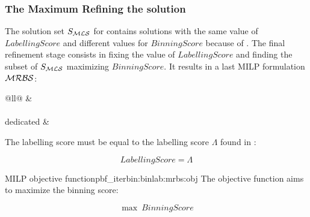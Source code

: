 \subsubsection{The Maximum Refining the \MLS{} solution}\label{sec:pbf_iterbin:binlab:mrbs}

The solution set \(S_{\mathcal{MLS}}{}\) for \MLS{} contains solutions with the same value of \(LabellingScore\) and different values for \(BinningScore\) because of .
The final refinement stage consists in fixing the value of \(LabellingScore\) and finding the subset of \(S_{\mathcal{MLS}}{}\) maximizing \(BinningScore\).
It results in a last MILP formulation \(\mathcal{MRBS}{}\):

\begin{table}[h!]
  \centering
  \label{tab:binlab:mrbs:cst}
  \begin{tabular}{@{}ll@{}}
    \toprule
     &  \\
    \midrule
     \\
    \addlinespace
    \MRBS{} dedicated &  \\
    \bottomrule
  \end{tabular}
\end{table}

The labelling score must be equal to the labelling score \(\Lambda{}\) found in \MLS{}:
\begin{Constraint}
  \begin{equation}
    LabellingScore = \Lambda
    \label{pbf_iterbin:binlab:mrbs:cst:fix_mls_obj} %
  \end{equation}
\end{Constraint}

\begin{definition}{\MRBS{} MILP objective function}{pbf_iterbin:binlab:mrbs:obj}
  The objective function aims to maximize the binning score:
  \begin{Objective}
    \begin{equation}
      \max ~ BinningScore
      \label{pbf_iterbin:binlab:mrbs:obj:max_binning_score} %
    \end{equation}
  \end{Objective}
\end{definition}
